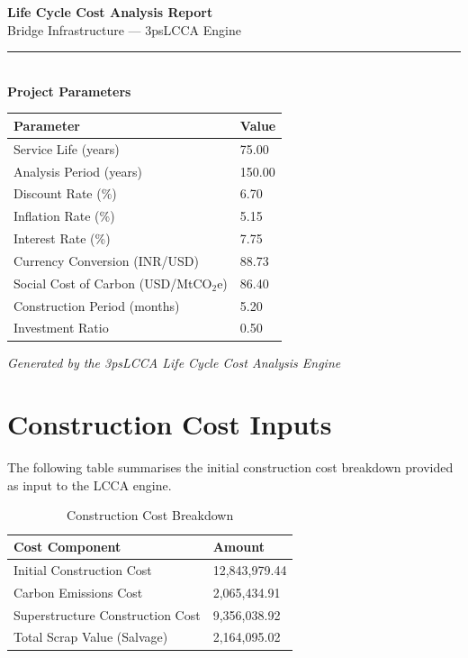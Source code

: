 \documentclass[12pt,a4paper]{article}
\begin{document}
\begin{titlepage}
\centering
\vspace*{2cm}
{\Huge\bfseries\color{headblue} Life Cycle Cost Analysis Report\\[0.5em]}
{\large\color{headblue} Bridge Infrastructure --- 3psLCCA Engine\\[2em]}
\rule{\linewidth}{0.4pt}\\[1em]
{\large\bfseries Project Parameters}\\[1em]
\begin{tabular}{L{8cm}R{5cm}}
\toprule
\textbf{Parameter} & \textbf{Value} \\
\midrule
  Service Life (years) & 75.00 \\
  Analysis Period (years) & 150.00 \\
  Discount Rate (\%) & 6.70 \\
  Inflation Rate (\%) & 5.15 \\
  Interest Rate (\%) & 7.75 \\
  Currency Conversion (INR/USD) & 88.73 \\
  Social Cost of Carbon (USD/MtCO$_2$e) & 86.40 \\
  Construction Period (months) & 5.20 \\
  Investment Ratio & 0.50 \\
\bottomrule
\end{tabular}
\vfill
{\small\textit{Generated by the 3psLCCA Life Cycle Cost Analysis Engine}}
\end{titlepage}
\tableofcontents
\newpage


\section{Construction Cost Inputs}

The following table summarises the initial construction cost breakdown provided as input to the LCCA engine.


\begin{table}[H]
\centering
\caption{Construction Cost Breakdown}
\begin{tabular}{L{9cm}R{5cm}}
\toprule
\textbf{Cost Component} & \textbf{Amount} \\
\midrule
  Initial Construction Cost & 12,843,979.44 \\
  Carbon Emissions Cost & 2,065,434.91 \\
  Superstructure Construction Cost & 9,356,038.92 \\
  Total Scrap Value (Salvage) & 2,164,095.02 \\
\bottomrule
\end{tabular}
\end{table}
\end{document}
